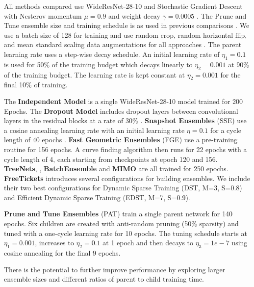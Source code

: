 \documentclass[letterpaper]{article} %
\begin{document}
All methods compared use WideResNet-28-10 and Stochastic Gradient Descent with Nesterov momentum $\mu=0.9$ and weight decay $\gamma=0.0005$ \cite{sutskever13nesterov}. The Prune and Tune ensemble size and training schedule is as used in previous comparisons \cite{wasay2020mothernets, garipov2018loss}.  We use a batch size of 128 for training and use random crop, random horizontal flip, and mean standard scaling data augmentations for all approaches \cite{garipov2018loss, havasi2021training, liu2021freetickets, huang2017snapshot}. The parent learning rate uses a step-wise decay schedule. An initial learning rate of $\eta_1=0.1$ is used for 50\% of the training budget which decays linearly to $\eta_2=0.001$ at 90\% of the training budget. The learning rate is kept constant at $\eta_2=0.001$ for the final 10\% of training. 

The {\bf Independent Model} is a single WideResNet-28-10 model trained for 200 Epochs. The {\bf Dropout Model} includes dropout layers between convolutional layers in the residual blocks at a rate of 30\% \cite{zagoruyko2017wide}. {\bf Snapshot Ensembles} (SSE) use a cosine annealing learning rate with an initial learning rate $\eta = 0.1$ for a cycle length of 40 epochs \cite{huang2017snapshot}. {\bf Fast Geometric Ensembles} (FGE) use a pre-training routine for 156 epochs. A curve finding algorithm then runs for 22 epochs with a cycle length of 4, each starting from checkpoints at epoch 120 and 156. {\bf TreeNets}, \cite{lee2015m}, {\bf BatchEnsemble} \cite{wen2020batchensemble} and {\bf MIMO} \cite{havasi2021training} are all trained for 250 epochs. {\bf FreeTickets} introduces several configurations for building ensembles. We include their two best configurations for Dynamic Sparse Training (DST, M=3, S=0.8) and Efficient Dynamic Sparse Training (EDST, M=7, S=0.9).

{\bf Prune and Tune Ensembles} (PAT) train a single parent network for 140 epochs. Six children are created with anti-random pruning (50\% sparsity) and tuned with a one-cycle learning rate for 10 epochs. The tuning schedule starts at $\eta_1=0.001$, increases to $\eta_2=0.1$ at 1 epoch and then decays to $\eta_3=1e-7$ using cosine annealing for the final 9 epochs.

There is the potential to further improve performance by exploring larger ensemble sizes and different ratios of parent to child training time.
\end{document}
